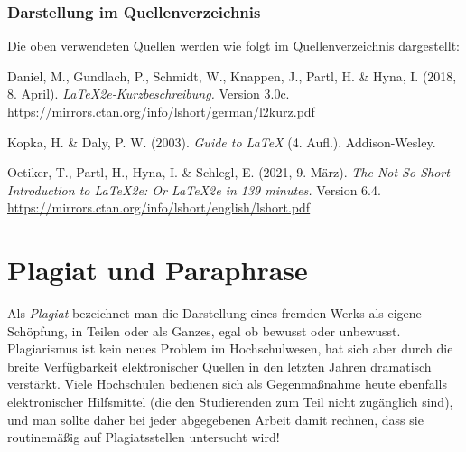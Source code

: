\subsubsection{Darstellung im Quellenverzeichnis}

\begin{sloppypar}
Die oben verwendeten Quellen werden wie folgt im Quellenverzeichnis dargestellt:
%
\begin{list}{}{
\setlength{\leftmargin}{1.3cm}
\setlength{\itemindent}{-1.3cm}
\setlength{\itemsep}{-0.15cm}
}
\item
Daniel, M., Gundlach, P., Schmidt, W., Knappen, J., Partl, H. \& Hyna, I.
(2018, 8. April).
\textit{\LaTeX2e-Kurzbeschreibung.} Version 3.0c.
\textrm{\url{https://mirrors.ctan.org/info/lshort/german/l2kurz.pdf}}
\item
Kopka, H. \& Daly, P. W. (2003). \textit{Guide to \LaTeX} (4. Aufl.).
Addison-Wesley.
\item
Oetiker, T., Partl, H., Hyna, I. \& Schlegl, E. (2021, 9. März). \textit{The
Not So Short Introduction to \LaTeX2e: Or \LaTeX2e in 139 minutes.} Version 6.4.
\url{https://mirrors.ctan.org/info/lshort/english/lshort.pdf}
\end{list}
\end{sloppypar}


\section{Plagiat und Paraphrase}
\label{sec:Plagiarismus}

Als \emph{Plagiat} bezeichnet man die Darstellung eines fremden Werks als
eigene Schöpfung, in Teilen oder als Ganzes, egal ob bewusst oder unbewusst.
Plagiarismus ist kein neues Problem im Hochschulwesen, hat sich aber durch
die breite Verfügbarkeit elektronischer Quellen in den letzten Jahren
dramatisch verstärkt. 
Viele Hochschulen bedienen sich als Gegenmaßnahme heute ebenfalls
elektronischer Hilfsmittel (die den Studierenden zum Teil nicht zugänglich
sind), und man sollte daher bei jeder abgegebenen Arbeit damit rechnen, dass
sie routinemäßig auf Plagiatsstellen untersucht wird!

